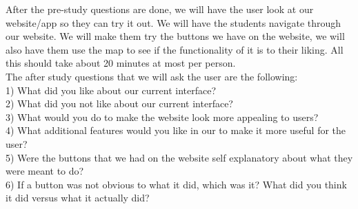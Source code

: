 \documentclass[12pt]{report}
\begin{document}
	After the pre-study questions are done, we will have the user look at our website/app so they can try it out. We will have the students navigate through our website. We will make them try the buttons we have on the website, we will also have them use the map to see if the functionality of it is to their liking. All this should take about 20 minutes at most per person.\\
	
	The after study questions that we will ask the user are the following: \\
	1) What did you like about our current interface?\\
	2) What did you not like about our current interface?\\
	3) What would you do to make the website look more appealing to users?\\
	4) What additional features would you like in our to make it more useful for the user?\\
	5) Were the buttons that we had on the website self explanatory about what they were meant to do? \\
	6) If a button was not obvious to what it did, which was it? What did you think it did versus what it actually did?\\
\end{document}
